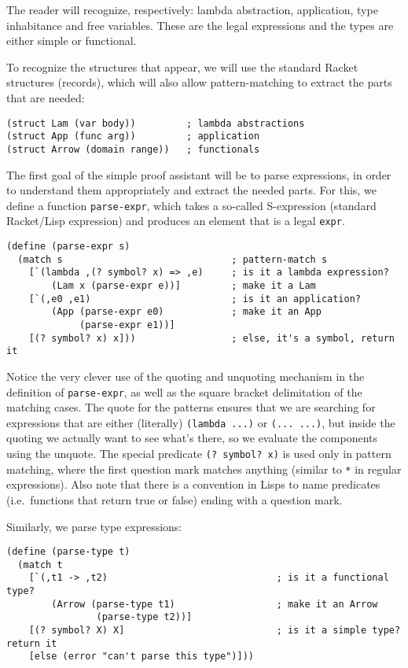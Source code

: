 The reader will recognize, respectively: lambda abstraction, application,
type inhabitance and free variables. These are the legal expressions
and the types are either simple or functional.

To recognize the structures that appear, we will use the standard
Racket structures (records), which will also allow pattern-matching to
extract the parts that are needed:
{
  \small
\begin{verbatim}
(struct Lam (var body))         ; lambda abstractions
(struct App (func arg))         ; application
(struct Arrow (domain range))   ; functionals
\end{verbatim}
}

The first goal of the simple proof assistant will be to parse expressions,
in order to understand them appropriately and extract the needed parts.
For this, we define a function \texttt{parse-expr}, which takes a so-called
S-expression (standard Racket/Lisp expression) and produces an element
that is a legal \texttt{expr}.
{
  \small
\begin{verbatim}
(define (parse-expr s)
  (match s                              ; pattern-match s
    [`(lambda ,(? symbol? x) => ,e)     ; is it a lambda expression?
        (Lam x (parse-expr e))]         ; make it a Lam
    [`(,e0 ,e1)                         ; is it an application?
        (App (parse-expr e0)            ; make it an App
             (parse-expr e1))]
    [(? symbol? x) x]))                 ; else, it's a symbol, return it
\end{verbatim}
}

Notice the very clever use of the quoting and unquoting mechanism in the
definition of \texttt{parse-expr}, as well as the square bracket delimitation
of the matching cases. The quote for the patterns ensures that we are searching
for expressions that are either (literally) \texttt{(lambda ...)} or \texttt{(... ...)},
but inside the quoting we actually want to see what's there, so we
evaluate the components using the unquote. The special predicate
\texttt{(? symbol? x)} is used only in pattern matching, where the first
question mark matches anything (similar to \texttt{*} in regular expressions).
Also note that there is a convention in Lisps to name predicates (i.e.\ functions
that return true or false) ending with a question mark.

Similarly, we parse type expressions:
{
  \small
\begin{verbatim}
(define (parse-type t)
  (match t
    [`(,t1 -> ,t2)                              ; is it a functional type?
        (Arrow (parse-type t1)                  ; make it an Arrow
                (parse-type t2))]
    [(? symbol? X) X]                           ; is it a simple type? return it
    [else (error "can't parse this type")]))
\end{verbatim}
}


